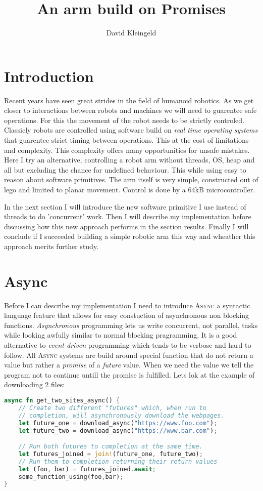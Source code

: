 \documentclass[lang=en, hanging-titles=true]{skrapport}
\title{An arm build on Promises}
\author[dskleingeld@gmail.com]{David Kleingeld}
\begin{document}
\maketitle
\tableofcontents

\section{Introduction}
Recent years have seen great strides in the field of humanoid robotics. As we get closer to interactions between robots and machines we will need to guarentee safe operations. For this the movement of the robot needs to be strictly controled. Classicly robots are controlled using software build on \textit{real time operating systems} that guarentee strict timing between operations. This at the cost of limitations and complexity. This complexity offers many opportunities for unsafe mistakes. Here I try an alternative, controlling a robot arm without threads, OS, heap and all but excluding the chance for undefined behaviour. This while using easy to reason about software primitives. The arm itself is very simple, constructed out of lego and limited to planar movement. Control is done by a 64kB microcontroller.

In the next section I will introduce the new software primitive I use instead of threads to do 'concurrent' work. Then I will describe my implementation before discussing how this new approach performs in the section results. Finally I will conclude if I succeeded building a simple robotic arm this way and wheather this approach merits further study.

\section{Async}
Before I can describe my implementation I need to introduce \textsc{Async} a syntactic language feature that allows for easy constuction of asynchronous non blocking functions. \textit{Asynchronous} programming lets us write concurrent, not parallel, tasks while looking awfully similar to normal blocking pragramming. It is a good alternative to \textit{event-driven} programming which tends to be verbose and hard to follow. All \textsc{Async} systems are build around special function that do not return a value but rather a \textit{promise} of a \textit{future} value. When we need the value we tell the program not to continue untill the promise is fulfilled. Lets lok at the example of downloading 2 files:

\begin{lstlisting}[language=rust, style=boxed, tabsize=2]
async fn get_two_sites_async() {
	// Create two different "futures" which, when run to 
	// completion, will asynchronously download the webpages.
	let future_one = download_async("https://www.foo.com");
	let future_two = download_async("https://www.bar.com");

	// Run both futures to completion at the same time.
	let futures_joined = join!(future_one, future_two);
	// Run them to completion returning their return values
	let (foo, bar) = futures_joined.await;
	some_function_using(foo,bar);
}
\end{lstlisting}
\end{document}
